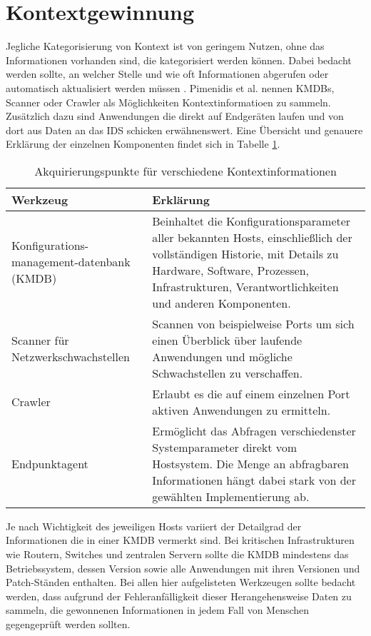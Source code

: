 \section{Kontextgewinnung}
Jegliche Kategorisierung von Kontext ist von geringem Nutzen, ohne das Informationen vorhanden sind, die kategorisiert werden können. Dabei bedacht werden sollte, an welcher Stelle und wie oft Informationen abgerufen oder automatisch aktualisiert werden müssen \cite{perera_context_2014}. Pimenidis et al. \cite{pimenidis2008context} nennen KMDBs, Scanner oder Crawler als Möglichkeiten Kontextinformatioen zu sammeln. Zusätzlich dazu sind Anwendungen die direkt auf Endgeräten laufen und von dort aus Daten an das IDS schicken erwähnenswert. Eine Übersicht und genauere Erklärung der einzelnen Komponenten findet sich in Tabelle \ref{Tabelle_2}. 
\begin{table}[H]
\label{Tabelle_2}
\caption{Akquirierungspunkte für verschiedene Kontextinformationen}
\begin{tabularx}{\columnwidth}{p{3cm} p{10cm}}
\toprule
Werkzeug & Erklärung\\
\midrule
Konfigurations-management-datenbank (KMDB) & 
Beinhaltet die Konfigurationsparameter aller bekannten Hosts, einschließlich der vollständigen Historie, mit Details zu Hardware, Software, Prozessen, Infrastrukturen, Verantwortlichkeiten und anderen Komponenten.\\
\midrule
Scanner für Netzwerkschwachstellen &  Scannen von beispielweise Ports um sich einen Überblick über laufende Anwendungen und mögliche Schwachstellen zu verschaffen. \\
\midrule
Crawler & Erlaubt es die auf einem einzelnen Port aktiven Anwendungen zu ermitteln.\\
\midrule
Endpunktagent & Ermöglicht das Abfragen verschiedenster Systemparameter direkt vom Hostsystem. Die Menge an abfragbaren Informationen hängt dabei stark von der gewählten Implementierung ab.\\
\bottomrule
\end{tabularx}
\end{table}
Je nach Wichtigkeit des jeweiligen Hosts variiert der Detailgrad der Informationen die in einer KMDB vermerkt sind. Bei kritischen Infrastrukturen wie Routern, Switches und zentralen Servern sollte die KMDB mindestens das Betriebssystem, dessen Version sowie alle Anwendungen mit ihren Versionen und Patch-Ständen enthalten. Bei allen hier aufgelisteten Werkzeugen sollte bedacht werden, dass aufgrund der Fehleranfälligkeit dieser Herangehensweise Daten zu sammeln, die gewonnenen Informationen in jedem Fall von Menschen gegengeprüft werden sollten.
